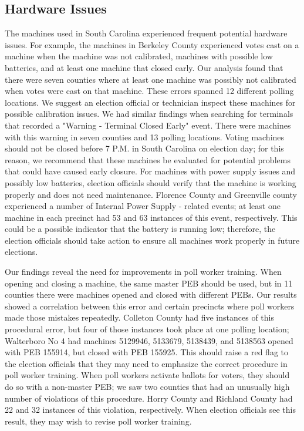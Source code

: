 \subsection{Hardware Issues}
The machines used in South Carolina experienced frequent potential
hardware issues.  For example, the machines in Berkeley County
experienced votes cast on a machine when the machine was not
calibrated, machines with possible low batteries, and at least one
machine that closed early.  Our analysis found that there were seven
counties where at least one machine was possibly not calibrated when
votes were cast on that machine. These errors spanned 12 different
polling locations.  We suggest an election official or technician
inspect these machines for possible calibration issues.  We had
similar findings when searching for terminals that recorded a "Warning
- Terminal Closed Early" event.  There were machines with this warning
in seven counties and 13 polling locations.  Voting machines should
not be closed before 7 P.M. in South Carolina on election day; for
this reason, we recommend that these machines be evaluated for
potential problems that could have caused early closure.  For machines
with power supply issues and possibly low batteries, election
officials should verify that the machine is working properly and does
not need maintenance.  Florence County and Greenville county
experienced a number of Internal Power Supply - related events; at
least one machine in each precinct had 53 and 63 instances of this
event, respectively.  This could be a possible indicator that the
battery is running low; therefore, the election officials should take
action to ensure all machines work properly in future elections. 

Our findings reveal the need for improvements in poll worker training.
When opening and closing a machine, the same master PEB should be used,
but in 11 counties there were machines opened and closed with
different PEBs.  Our results showed a correlation between this error
and certain precincts where poll workers made those mistakes
repeatedly.  Colleton County had five instances of this procedural
error, but four of those instances took place at one polling location;
Walterboro No 4 had machines 5129946, 5133679, 5138439, and 5138563
opened with PEB 155914, but closed with PEB 155925.  This should raise
a red flag to the election officials that they may need to emphasize
the correct procedure in poll worker training.  When poll workers
activate ballots for voters, they should do so with a non-master PEB;
we saw two counties that had an unusually high number of violations of
this procedure.  Horry County and Richland County had 22 and 32
instances of this violation, respectively.  When election officials
see this result, they may wish to revise poll worker training.  


